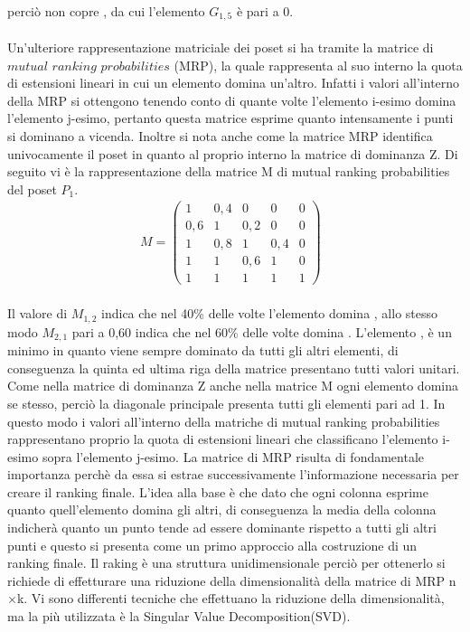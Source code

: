 \documentclass[a4paper,12pt, openright]{report}
\begin{document}
perciò  non copre , da cui l'elemento $G_{1,5}$ è pari a 0. \\
\\
Un'ulteriore rappresentazione matriciale dei poset si ha tramite la matrice di \linebreak $\textit{mutual ranking probabilities}$
(MRP), la quale 
rappresenta al suo interno la quota di estensioni lineari in cui un elemento domina un'altro. Infatti i valori all'interno della MRP si ottengono tenendo conto di quante volte l'elemento i-esimo 
domina l'elemento j-esimo, pertanto
questa matrice esprime quanto intensamente i punti si dominano a vicenda. Inoltre si nota anche come la matrice 
MRP identifica univocamente il poset in quanto  al proprio interno la matrice di dominanza 
Z. Di seguito vi è la rappresentazione della matrice M di mutual ranking probabilities
del poset $P_{1}$. 
\begin{align}
    M = 
    \left( \begin{array}{ccccc} 1 & 0,4 & 0 & 0 & 0 \\
        0,6 & 1 & 0,2 & 0 & 0\\
        1 & 0,8 & 1 & 0,4 & 0\\
        1 & 1 & 0,6 & 1 & 0\\
        1 & 1 & 1 & 1 & 1 \end{array} \right)
    \mbox{                  }
\end{align}
\\
Il valore di $M_{1,2}$ indica che nel 40\% delle volte l'elemento  domina , allo stesso 
modo $M_{2,1}$ pari a 0,60 indica che nel 60\% delle volte  domina . L'elemento , è 
un minimo in quanto viene sempre dominato da tutti gli altri elementi, di conseguenza la quinta ed ultima riga della matrice 
presentano tutti valori unitari. Come nella matrice di dominanza Z anche nella matrice M ogni elemento
domina se stesso, perciò la diagonale principale presenta tutti gli elementi pari ad 1. 
In questo modo i valori all'interno della matriche di mutual ranking probabilities rappresentano proprio la quota 
di estensioni lineari che classificano l'elemento i-esimo sopra l'elemento j-esimo. 
La matrice di MRP risulta di fondamentale importanza perchè da essa si estrae successivamente l'informazione
necessaria per creare il ranking finale. L'idea alla base è che dato che ogni colonna esprime quanto 
quell'elemento domina gli altri, di conseguenza la media della colonna indicherà quanto un punto tende ad essere 
dominante rispetto a tutti gli altri punti e questo si presenta come un primo approccio alla costruzione di un ranking
finale. Il raking è una struttura unidimensionale perciò per ottenerlo si richiede di effetturare una 
riduzione della dimensionalità della matrice di MRP n$\times$k. Vi sono differenti tecniche che 
effettuano la riduzione della dimensionalità, ma la più utilizzata è la Singular Value Decomposition(SVD). 
\end{document}
